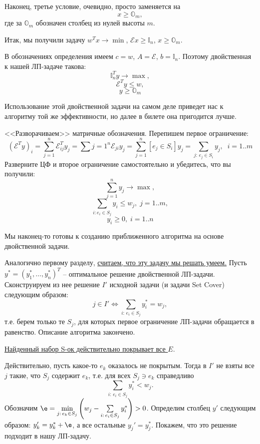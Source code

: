 Наконец, третье условие, очевидно, просто заменяется на $$x \geq \mathbb{O}_m,$$ где за $\mathbb{O}_m$ обозначен столбец из нулей высоты $m$.

Итак, мы получили задачу $w^Tx \rightarrow \min$, $\mathcal{E} x \geq \mathbb{I}_n$, $x \geq \mathbb{O}_m$. 


В обозначениях определения имеем $c = w$, $A = \mathcal E$, $b = \mathbb{I}_n$. Поэтому двойственная к нашей ЛП-задаче такова: 
$$\mathbb{I}_n^Ty \rightarrow \max,$$
$$\mathcal{E}^T y \leq w,$$
$$y \geq \mathbb{O}_m$$

Использование этой двойственной задачи на самом деле приведет нас к алгоритму той же эффективности, но далее в билете она пригодится лучше. 

<<Разворачиваем>> матричные обозначения. Перепишем первое ограничение:
$$(\mathcal{E}^Ty)_i = \sum_{j=1}^n\mathcal{E}^T_{ij}y_j = \sum{j=1}^n\mathcal{E}_{ji}y_j = \sum_{j=1}^n [e_j \in S_i] y_j = \sum_{j:\, e_j \in S_i} y_j, \;\; i=1..m$$
Разверните ЦФ и второе ограничение самостоятельно и убедитесь, что вы получили:
$$\sum_{j=1}^n y_j \rightarrow\max,$$
$$\sum_{i: e_i \in S_j} y_i\leq w_j, \; j=1..m,$$
$$y_i \geq 0, \; i=1..n$$

Мы наконец-то готовы к созданию приближенного алгоритма на основе двойственной задачи. 


Аналогично первому разделу, \underline{считаем, что эту задачу мы решать умеем.} Пусть $y^* = (y_1^*, \ldots, y_n^*)^T$ -- оптимальное решение двойственной ЛП-задачи. Сконструируем из нее решение $I'$ исходной задачи (и задачи Set Cover) следующим образом:
$$j \in I' \iff \sum_{i:\, e_i \in S_j}y_i^* = w_j,$$
т.е. берем только те $S_j$, для которых первое ограничение ЛП-задачи обращается в равенство.
Описание алгоритма закончено.

\underline{Найденный набор S-ок действительно покрывает все $E$}.

Действительно, пусть какое-то $e_k$ оказалось не покрытым. Тогда в $I'$ не взяты все $j$ такие, что $S_j$ содержит $e_k$, т.е. для всех $S_j \ni e_k$ справедливо $$\sum_{i:\, e_i \in S_j}y_i^* < w_j.$$
Обозначим $\e = \min\limits_{j:\, e_k \in S_j} \left(w_j - \sum\limits_{i:\, e_i \in S_j}y_i^*\right) > 0$. Определим столбец $y'$ следующим образом: $y_k' = y_k^* + \e$, а все остальные $y_j' = y_j^*$. Покажем, что это решение подходит в нашу ЛП-задачу. 

